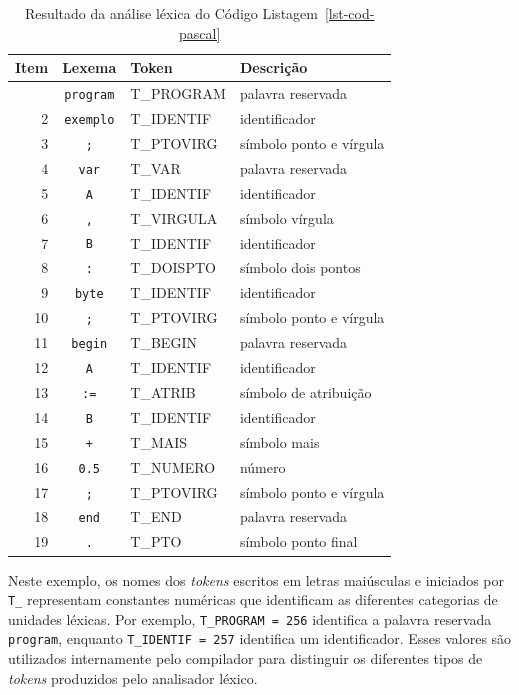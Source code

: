 \documentclass[
  brazilian,
  letterpaper,
]{book}
\theoremstyle{plain}
\theoremstyle{definition}
\theoremstyle{remark}
\begin{document}
\begin{longtable}[]{|r|c|l|l|}

\caption{\label{tbl-simboloslexicos}Resultado da análise léxica do
Código Listagem~\ref{lst-cod-pascal}}

\tabularnewline

\toprule\noalign{}
Item & Lexema & Token & Descrição \\
\midrule\noalign{}
\endhead
\bottomrule\noalign{}
\endlastfoot
1 & \texttt{program} & T\_PROGRAM & palavra reservada \\
\midrule
2 & \texttt{exemplo} & T\_IDENTIF & identificador \\
\midrule
3 & \texttt{;} & T\_PTOVIRG & símbolo ponto e vírgula \\
\midrule
4 & \texttt{var} & T\_VAR & palavra reservada \\
\midrule
5 & \texttt{A} & T\_IDENTIF & identificador \\
\midrule
6 & \texttt{,} & T\_VIRGULA & símbolo vírgula \\
\midrule
7 & \texttt{B} & T\_IDENTIF & identificador \\
\midrule
8 & \texttt{:} & T\_DOISPTO & símbolo dois pontos \\
\midrule
9 & \texttt{byte} & T\_IDENTIF & identificador \\
\midrule
10 & \texttt{;} & T\_PTOVIRG & símbolo ponto e vírgula \\
\midrule
11 & \texttt{begin} & T\_BEGIN & palavra reservada \\
\midrule
12 & \texttt{A} & T\_IDENTIF & identificador \\
\midrule
13 & \texttt{:=} & T\_ATRIB & símbolo de atribuição \\
\midrule
14 & \texttt{B} & T\_IDENTIF & identificador \\
\midrule
15 & \texttt{+} & T\_MAIS & símbolo mais \\
\midrule
16 & \texttt{0.5} & T\_NUMERO & número \\
\midrule
17 & \texttt{;} & T\_PTOVIRG & símbolo ponto e vírgula \\
\midrule
18 & \texttt{end} & T\_END & palavra reservada \\
\midrule
19 & \texttt{.} & T\_PTO & símbolo ponto final \\

\end{longtable}

Neste exemplo, os nomes dos \emph{tokens} escritos em letras maiúsculas
e iniciados por \texttt{T\_} representam constantes numéricas que
identificam as diferentes categorias de unidades léxicas. Por exemplo,
\texttt{T\_PROGRAM\ =\ 256} identifica a palavra reservada
\texttt{program}, enquanto \texttt{T\_IDENTIF\ =\ 257} identifica um
identificador. Esses valores são utilizados internamente pelo compilador
para distinguir os diferentes tipos de \emph{tokens} produzidos pelo
analisador léxico.
\end{document}

